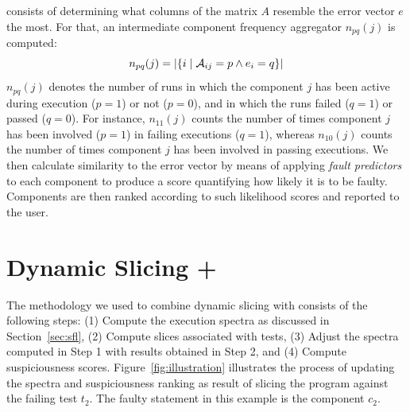 \documentclass[sigplan,10pt,review,anonymous]{acmart}\settopmatter{printfolios=true,printccs=false,printacmref=false}
\begin{document}
consists of determining what columns of the matrix $A$ resemble the
error vector $e$ the most.  For that, an intermediate component
frequency aggregator $n_{pq}(j)$ is computed:
%
\begin{equation}\label{eq:occurrence}
 n_{pq}(j) = |\{i\mid \mathcal{A}_{ij}=p \wedge e_i=q\}|
\end{equation}
%
$n_{pq}(j)$ denotes the number of runs in which the
component $j$ has been active during execution ($p = 1$) or not
($p=0$), and in which the runs failed ($q = 1$) or passed ($q = 0$).
For instance, $n_{11}(j)$ counts the number of times component $j$ has
been involved ($p = 1$) in failing executions ($q = 1$), whereas
$n_{10}(j)$ counts the number of times component $j$ has been involved
in passing executions. We then calculate similarity to the error
vector by means of applying \emph{fault predictors} to each component
to produce a score quantifying how likely it is to be faulty.
Components are then ranked according to such likelihood scores and
reported to the user. 


\section{Dynamic Slicing + \sfl{}}
\label{sec:combination}

The methodology we used to combine dynamic slicing with \sfl{}
consists of the following steps: (1) Compute the execution spectra as
discussed in Section~\ref{sec:sfl}, (2) Compute slices associated with
tests, (3) Adjust the spectra computed in Step 1 with results obtained
in Step 2, and (4) Compute suspiciousness
scores. Figure~\ref{fig:illustration} illustrates the process of
updating the spectra and suspiciousness ranking as result of slicing
the program against the failing test $t_2$.  The faulty statement in
this example is the component $c_2$.

\end{document}
